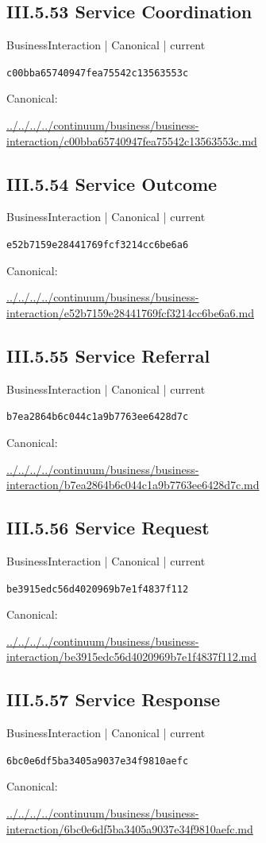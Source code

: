 \documentclass[10pt,a4paper]{article}
\begin{document}
\subsection*{III.5.53 Service Coordination}
{\small BusinessInteraction | Canonical | current}\par
\texttt{c00bba65740947fea75542c13563553c}\par
Canonical: \par
{\footnotesize\url{../../../../continuum/business/business-interaction/c00bba65740947fea75542c13563553c.md}}\par
\subsection*{III.5.54 Service Outcome}
{\small BusinessInteraction | Canonical | current}\par
\texttt{e52b7159e28441769fcf3214cc6be6a6}\par
Canonical: \par
{\footnotesize\url{../../../../continuum/business/business-interaction/e52b7159e28441769fcf3214cc6be6a6.md}}\par
\subsection*{III.5.55 Service Referral}
{\small BusinessInteraction | Canonical | current}\par
\texttt{b7ea2864b6c044c1a9b7763ee6428d7c}\par
Canonical: \par
{\footnotesize\url{../../../../continuum/business/business-interaction/b7ea2864b6c044c1a9b7763ee6428d7c.md}}\par
\subsection*{III.5.56 Service Request}
{\small BusinessInteraction | Canonical | current}\par
\texttt{be3915edc56d4020969b7e1f4837f112}\par
Canonical: \par
{\footnotesize\url{../../../../continuum/business/business-interaction/be3915edc56d4020969b7e1f4837f112.md}}\par
\subsection*{III.5.57 Service Response}
{\small BusinessInteraction | Canonical | current}\par
\texttt{6bc0e6df5ba3405a9037e34f9810aefc}\par
Canonical: \par
{\footnotesize\url{../../../../continuum/business/business-interaction/6bc0e6df5ba3405a9037e34f9810aefc.md}}\par
\end{document}
